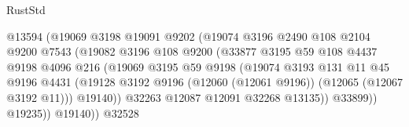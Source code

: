 \begin{lexlean}{RustStd}
\begin{coremodule}
                                      @13594
                                      (@19069
                                        @3198
                                        @19091
                                        @9202
                                        (@19074
                                          @3196
                                          @2490
                                          @108
                                          @2104
                                          @9200
                                          @7543
                                          (@19082
                                            @3196
                                            @108
                                            @9200
                                            (@33877
                                              @3195
                                              @59
                                              @108
                                              @4437
                                              @9198
                                              @4096
                                              @216
                                              (@19069
                                                @3195
                                                @59
                                                @9198
                                                (@19074
                                                  @3193
                                                  @131
                                                  @11
                                                  @45
                                                  @9196
                                                  @4431
                                                  (@19128
                                                    @3192
                                                    @9196
                                                    (@12060 (@12061 @9196))
                                                    (@12065 (@12067 @3192 @11)))
                                                  @19140))
                                              @32263
                                              @12087
                                              @12091
                                              @32268
                                              @13135))
                                          @33899))
                                      @19235))
                                  @19140))
                              @32528

\end{coremodule}
\end{lexlean}
